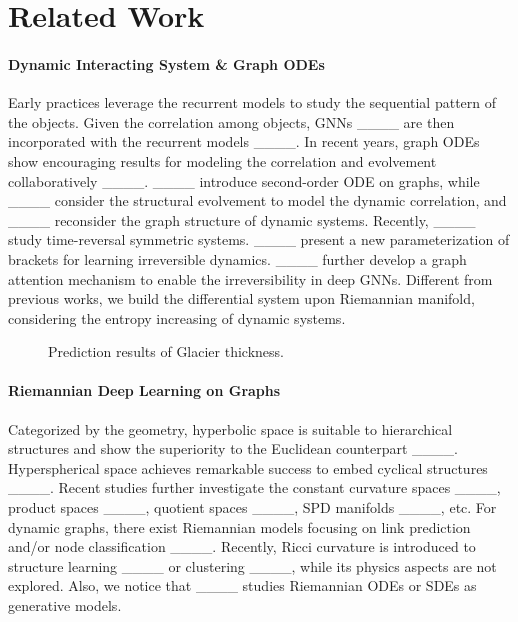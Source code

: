 \section{Related Work}
\paragraph{Dynamic Interacting System \& Graph ODEs}
Early practices leverage the recurrent models  to study the sequential pattern of the objects.
Given the correlation among objects, GNNs ____ are then incorporated with the recurrent models ____.
In recent years, graph ODEs show encouraging results for modeling the correlation and evolvement collaboratively ____.
____ introduce second-order ODE on graphs,
 while  ____ consider the structural evolvement to model the dynamic correlation, and
____ reconsider the graph structure of dynamic systems.
Recently, ____ study  time-reversal symmetric systems. ____ present a new parameterization of brackets for learning irreversible dynamics. ____ further develop a  graph attention mechanism  to enable the irreversibility in deep GNNs.
Different from previous works, we build the differential system upon Riemannian manifold, considering the entropy increasing of dynamic systems.


\begin{figure} 
\centering 
{}
\vspace{-0.1in}
 \caption{Prediction results of Glacier thickness.}
\label{Fig-glacier}
\end{figure}


\paragraph{Riemannian Deep Learning on Graphs}
Categorized by the geometry, 
hyperbolic space is suitable to hierarchical structures and show the superiority to the Euclidean counterpart ____.
Hyperspherical space achieves remarkable success to embed cyclical structures ____.
Recent studies further investigate the constant curvature spaces ____, product spaces ____, quotient spaces ____, SPD manifolds ____, etc. 
For dynamic graphs, there exist Riemannian models focusing on link prediction and/or node classification ____.
Recently, Ricci curvature is introduced to structure learning ____ or clustering ____, while its physics aspects are not explored.
Also, we notice that ____ studies Riemannian ODEs or SDEs as generative models.

